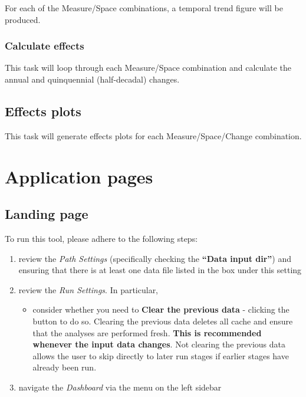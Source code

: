 \documentclass[
  8pt,
  a4paper]{article}
\providecommand{\tightlist}{%
  \setlength{\itemsep}{0pt}\setlength{\parskip}{0pt}}
\begin{document}
For each of the Measure/Space combinations, a temporal trend figure will
be produced.

\subsubsection{Calculate effects}\label{calculate-effects}

This task will loop through each Measure/Space combination and calculate
the annual and quinquennial (half-decadal) changes.

\subsection{Effects plots}\label{effects-plots}

This task will generate effects plots for each Measure/Space/Change
combination.

\section{Application pages}\label{application-pages}

\subsection{Landing page}\label{sec-landing}

To run this tool, please adhere to the following steps:

\begin{enumerate}
\def\labelenumi{\arabic{enumi}.}
\tightlist
\item
  review the \emph{Path Settings} (specifically checking the
  \textbf{``Data input dir''}) and ensuring that there is at least one
  data file listed in the box under this setting
\item
  review the \emph{Run Settings}. In particular,

  \begin{itemize}
  \tightlist
  \item
    consider whether you need to \textbf{Clear the previous data} -
    clicking the button to do so. Clearing the previous data deletes all
    cache and ensure that the analyses are performed fresh. \textbf{This
    is recommended whenever the input data changes}. Not clearing the
    previous data allows the user to skip directly to later run stages
    if earlier stages have already been run.
  \end{itemize}
\item
  navigate the \emph{Dashboard} via the menu on the left sidebar
\end{enumerate}
\end{document}
